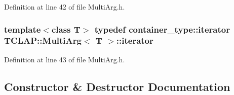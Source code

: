 Definition at line 42 of file Multi\+Arg.\+h.

\hypertarget{class_t_c_l_a_p_1_1_multi_arg_a34196784baca2bd5aa079d639d49a7ca}{}
\subsubsection[{iterator}]{\setlength{\rightskip}{0pt plus 5cm}template$<$class T$>$ typedef container\+\_\+type\+::iterator {\bf T\+C\+L\+A\+P\+::\+Multi\+Arg}$<$ T $>$\+::{\bf iterator}}\label{class_t_c_l_a_p_1_1_multi_arg_a34196784baca2bd5aa079d639d49a7ca}


Definition at line 43 of file Multi\+Arg.\+h.



\subsection{Constructor \& Destructor Documentation}
\hypertarget{class_t_c_l_a_p_1_1_multi_arg_a49b5437c7f06cd6864c07dc59814a953}{}
